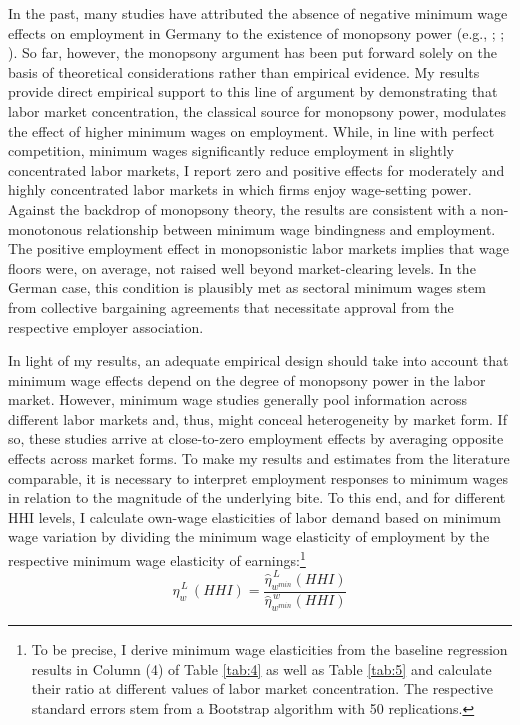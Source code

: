 \documentclass[11pt,oneside,reqno,xcolor=dvipsnames]{article} %
\begin{document}
In the past, many studies have attributed the absence of negative minimum wage effects on employment in Germany to the existence of monopsony power (e.g., \citealp{Moeller2012}; \citealp{Frings2013}; \citealp{CaliendoEtAl2018}). So far, however, the monopsony argument has been put forward solely on the basis of theoretical considerations rather than empirical evidence. My results provide direct empirical support to this line of argument by demonstrating that labor market concentration, the classical source for monopsony power, modulates the effect of higher minimum wages on employment. While, in line with perfect competition, minimum wages significantly reduce employment in slightly concentrated labor markets, I report zero and positive effects for moderately and highly concentrated labor markets in which firms enjoy wage-setting power. Against the backdrop of monopsony theory, the results are consistent with a non-monotonous relationship between minimum wage bindingness and employment. The positive employment effect in monopsonistic labor markets implies that wage floors were, on average, not raised well beyond market-clearing levels. In the German case, this condition is plausibly met as sectoral minimum wages stem from collective bargaining agreements that necessitate approval from the respective employer association.



In light of my results, an adequate empirical design should take into account that minimum wage effects depend on the degree of monopsony power in the labor market. However, minimum wage studies generally pool information across different labor markets and, thus, might conceal heterogeneity by market form. If so, these studies arrive at close-to-zero employment effects by averaging opposite effects across market forms. To make my results and estimates from the literature comparable, it is necessary to interpret employment responses to minimum wages in relation to the magnitude of the underlying bite. To this end, and for different HHI levels, I calculate own-wage elasticities of labor demand based on minimum wage variation by dividing the minimum wage elasticity of employment by the respective minimum wage elasticity of earnings:\footnote{To be precise, I derive minimum wage elasticities from the baseline regression results in Column (4) of Table \ref{tab:4} as well as Table \ref{tab:5} and calculate their ratio at different values of labor market concentration. The respective standard errors stem from a Bootstrap algorithm with 50 replications.}
\begin{equation}
\label{eq:5}
\hat{\eta}^{\,L}_{w} \,(H\!H\!I) = \frac{\hat{\eta}^{\,L}_{w^{min}} (H\!H\!I) }{ \hat{\eta}^{\,w}_{w^{min}} (H\!H\!I) }
\end{equation} %
\end{document}
